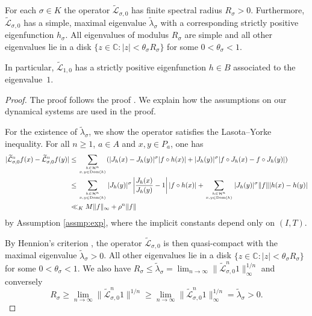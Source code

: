 \documentclass[12pt,a4paper,reqno]{amsart}
\begin{document}
\begin{proposition} \label{thm:PF}
For each $\sigma \in K$ the operator $\widetilde{\mathcal{L}}_{\sigma,0}$ has finite spectral radius $R_\sigma > 0$. Furthermore, $\widetilde{\mathcal{L}}_{\sigma,0}$ has a simple, maximal eigenvalue $\widetilde{\lambda}_{\sigma}$ with a corresponding strictly positive eigenfunction $h_\sigma$. All eigenvalues of modulus $R_{\sigma}$ are simple and all other eigenvalues lie in a disk $\{z \in \mathbb{C} : |z| < \theta_{\sigma} R_{\sigma}\}$ for some $0 < \theta_{\sigma} < 1$. 

In particular, $\widetilde{\mathcal{L}}_{1,0}$  has a strictly positive eigenfunction $h \in B$ associated to the eigenvalue~$1$.
\end{proposition}
\begin{proof}
The proof follows the proof \cite[Theorem 1.5]{Baladi}. We explain how the assumptions on our dynamical systems are used in the proof.

For the existence of $\widetilde{\lambda}_{\sigma}$, we show the operator satisfies the Lasota--Yorke inequality. For all $n \geq 1$, $a \in A$ and $x,y \in P_a$, one has 
\begin{align*}
|\widetilde{\mathcal{L}}_{\sigma, 0}^n f(x) - \widetilde{\mathcal{L}}_{\sigma,0}^n f(y)| & \leq \sum_{h \in \mathcal{H}^n \atop x,y \in \mathrm{Dom}(h)} (|J_h(x)-J_h(y)|^\sigma | f \circ h(x)| + |J_h(y)|^\sigma |f \circ J_h(x)-f \circ J_h(y)|) \\
& \leq \sum_{h \in \mathcal{H}^n \atop x,y \in \mathrm{Dom}(h)} |J_h(y)|^\sigma \left| \frac{J_h(x)}{J_h(y)}-1\right| |f \circ h(x)| + \sum_{h \in \mathcal{H}^n \atop x,y \in \mathrm{Dom}(h)} |J_h(y)|^\sigma \|f \| |h(x)-h(y)| \\
&\ll_K  M \|f \|_\infty + \rho^n  \| f \| 
\end{align*}
by Assumption \ref{assmp:exp}, where the implicit constants depend only on $(I,T)$. 

By Hennion's criterion \cite[Theorem XIV.3]{hennion}, the operator $\widetilde{\mathcal{L}}_{\sigma, 0}$ is then quasi-compact with the maximal eigenvalue $\widetilde{\lambda}_{\sigma}>0$. All other eigenvalues lie in a disk $\{z \in \mathbb{C} : |z| < \theta_{\sigma} R_{\sigma}\}$ for some $0 < \theta_{\sigma} < 1$. We also have $R_\sigma \leq \widetilde{\lambda}_\sigma=\lim_{n \rightarrow \infty} \| \widetilde{\mathcal{L}}_{\sigma, 0}^n 1 \|_\infty^{1/n}$ and conversely
\[ R_\sigma \geq \lim_{n \rightarrow \infty} \| \widetilde{\mathcal{L}}_{\sigma, 0}^n 1 \|^{1/n} \geq \lim_{n \rightarrow \infty} \| \widetilde{\mathcal{L}}_{\sigma, 0}^n 1 \|_\infty^{1/n}=\widetilde{\lambda}_\sigma>0. \]


\end{proof}
\end{document}
